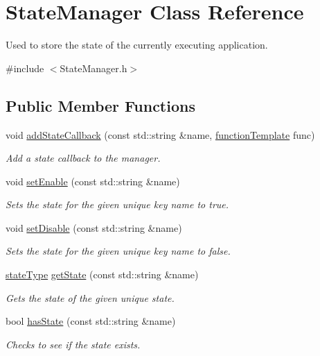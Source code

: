 \hypertarget{class_state_manager}{\section{State\-Manager Class Reference}
\label{d4/d44/class_state_manager}
}


Used to store the state of the currently executing application.  




{\ttfamily \#include $<$State\-Manager.\-h$>$}

\subsection*{Public Member Functions}
\begin{DoxyCompactItemize}
\item 
void \hyperlink{class_state_manager_a5326cbc5f82060722a0f0517131d21da}{add\-State\-Callback} (const std\-::string \&name, \hyperlink{_callback_manager_8h_a73a0c6254a0b5ab661ca1f3bd5f3d99c}{function\-Template} func)
\begin{DoxyCompactList}\small\item\em Add a state callback to the manager. \end{DoxyCompactList}\item 
void \hyperlink{class_state_manager_a1c2836c58bda4fbe6297eac2c0b4e3e1}{set\-Enable} (const std\-::string \&name)
\begin{DoxyCompactList}\small\item\em Sets the state for the given unique key name to true. \end{DoxyCompactList}\item 
void \hyperlink{class_state_manager_a076ee94a7709a74ce1b31721c19c7e27}{set\-Disable} (const std\-::string \&name)
\begin{DoxyCompactList}\small\item\em Sets the state for the given unique key name to false. \end{DoxyCompactList}\item 
\hyperlink{_state_manager_8h_a63bb34c4863a6b3cf2b7d661aa1c4ff5}{state\-Type} \hyperlink{class_state_manager_adf17c58841a6d2523af1505d9b6da46c}{get\-State} (const std\-::string \&name)
\begin{DoxyCompactList}\small\item\em Gets the state of the given unique state. \end{DoxyCompactList}\item 
bool \hyperlink{class_state_manager_a32bec464e01ca3cb16824c1dedf71bb9}{has\-State} (const std\-::string \&name)
\begin{DoxyCompactList}\small\item\em Checks to see if the state exists. \end{DoxyCompactList}\end{DoxyCompactItemize}

